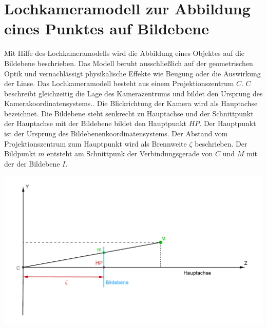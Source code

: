 \section{Lochkameramodell zur Abbildung eines Punktes auf Bildebene}

Mit Hilfe des Lochkameramodells wird die Abbildung eines Objektes auf die Bildebene beschrieben.
Das Modell beruht ausschließlich auf der geometrischen Optik und vernachlässigt physikalische Effekte wie Beugung oder die Auswirkung der Linse\cite{Heipke}. Das Lochkameramodell besteht aus einem Projektionszentrum $C$. $C$ beschreibt gleichzeitig die Lage des Kamerazentrums und bildet den Ursprung des Kamerakoordinatensystems.\cite{CamerModels.,HZ}.
Die Blickrichtung der Kamera wird als Hauptachse bezeichnet. Die Bildebene steht senkrecht zu Hauptachse und der Schnittpunkt der Hauptachse mit der Bildebene bildet den Hauptpunkt $HP$. Der Hauptpunkt ist der Ursprung des Bildebenenkoordinatensystems. Der Abstand vom Projektionszentrum zum Hauptpunkt wird als Brennweite $\zeta$ beschrieben\cite{HZ,CamerModels.}. Der Bildpunkt $m$ entsteht am Schnittpunk der Verbindungsgerade von $C$ und $M$ mit der der Bildebene $I$. 

\begin{minipage}{\linewidth}
	\centering
	\includegraphics[width=.8\linewidth]{images/PinholeCameraModell2D.png}
	\label{fig:PinholeCamera2D}
\end{minipage}\\ \\

